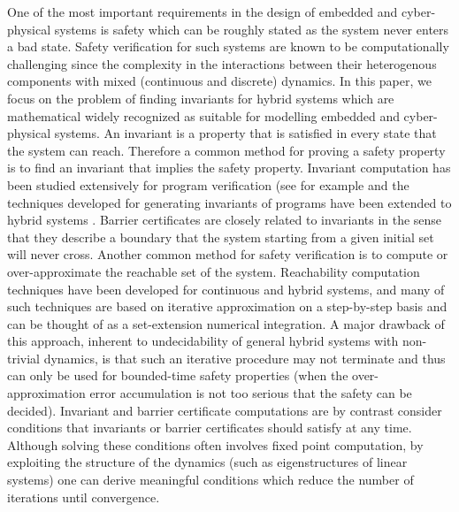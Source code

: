 One of the most important requirements in the design of embedded and cyber-physical systems is safety which can be roughly stated as the system never enters a bad state. Safety verification for such systems are known to be computationally challenging since the complexity in the interactions between their heterogenous components with mixed (continuous and discrete) dynamics. In this paper, we focus on the problem of finding invariants for hybrid systems which are mathematical widely recognized as suitable for modelling embedded and cyber-physical systems. An invariant is a property that is satisfied in every state that the system can reach. 
Therefore a common method for proving a safety property is to find an invariant that implies the safety property. Invariant computation has been studied extensively for program verification (see for example \cite{CousotHalbwachs1978,Bensalem2000,Tiwari2001,SriramSipma2004,colonSriramSipma2003,Fluctuate} and the techniques developed for generating invariants of programs have been extended to hybrid systems \cite{Sriram,Jeannet,tiwariRodriguezCarbonellPolynomialInvariants,Goubault,HybridFluctuate,differentialInvariantPlatzer,Gawlitza}. Barrier certificates \cite{Parillo...} are closely related to invariants in the sense that they describe a boundary that the system starting from a given initial set will never cross. Another common method for safety verification is to compute or over-approximate the reachable set of the system. Reachability computation techniques have been developed for continuous and hybrid systems, and many of such techniques are based on iterative approximation on a step-by-step basis and can be thought of as a set-extension numerical integration. A major drawback of this approach, inherent to undecidability of general hybrid systems with non-trivial dynamics, is that such an iterative procedure may not terminate and thus can only be used for bounded-time safety properties (when the over-approximation error accumulation is not too serious that the safety can be decided). Invariant and barrier certificate computations are by contrast consider conditions that invariants or barrier certificates should satisfy at any time. Although solving these conditions often involves fixed point computation, by exploiting the structure of the dynamics (such as eigenstructures of linear systems) one can derive meaningful conditions which reduce the number of iterations until convergence.